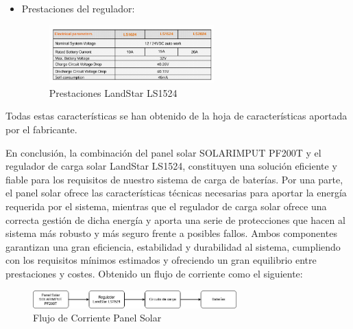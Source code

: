 \begin{itemize}
    \item Prestaciones del regulador:
    \begin{figure}[H]
        \centering
        \includegraphics[width=0.6\textwidth]{images/2-hardware/Panel Solar/Regulador.png}
        \caption{Prestaciones LandStar LS1524}
        \label{fig:4-1-2-Regulador}
    \end{figure}
\end{itemize}

Todas estas características se han obtenido de la hoja de características aportada por el fabricante.\cite{epsolarLandStarSeriesSolar}

En conclusión, la combinación del panel solar SOLARIMPUT PF200T y el regulador de carga solar LandStar LS1524, constituyen una solución eficiente y fiable para los requisitos de nuestro sistema de carga de baterías. Por una parte, el panel solar ofrece las características técnicas necesarias para aportar la energía requerida por el sistema, mientras que el regulador de carga solar ofrece una correcta gestión de dicha energía y aporta una serie de protecciones que hacen al sistema más robusto y más seguro frente a posibles fallos. Ambos componentes garantizan una gran eficiencia, estabilidad y durabilidad al sistema, cumpliendo con los requisitos mínimos estimados y ofreciendo un gran equilibrio entre prestaciones y costes. Obtenido un flujo de corriente como el siguiente:

\begin{figure}[H]
    \centering
    \includegraphics[width=0.7\textwidth]{images/2-hardware/Panel Solar/DiagramaBloquesPanel.jpg}
    \caption{Flujo de Corriente Panel Solar}
    \label{fig:4-1-2-FlujoCorrientePanel}
\end{figure}

